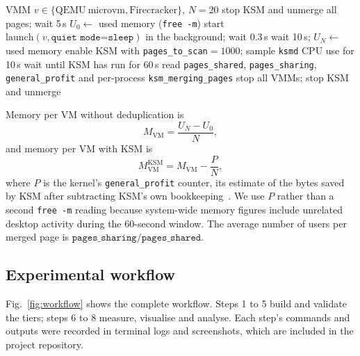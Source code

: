 \documentclass[pdflatex,sn-mathphys-num]{sn-jnl}%
\begin{document}
\begin{algorithm}[ht]
\caption{Density and KSM measurement (B4)}\label{alg:ksm}
\begin{algorithmic}[1]
\Require VMM $v \in \{\mathrm{QEMU\ microvm},\mathrm{Firecracker}\}$, $N=20$
\State stop KSM and unmerge all pages; wait 5\,s
\State $U_0 \gets$ used memory (\texttt{free -m})
  \State start $\mathrm{launch}(v,\texttt{quiet mode=sleep})$ in the background; wait 0.3\,s
\EndFor
\State wait 10\,s; $U_N \gets$ used memory
\State enable KSM with \texttt{pages\_to\_scan}$=1000$; sample \texttt{ksmd} CPU use for 10\,s
\State wait until KSM has run for 60\,s
\State read \texttt{pages\_shared}, \texttt{pages\_sharing}, \texttt{general\_profit} and per-process \texttt{ksm\_merging\_pages}
\State stop all VMMs; stop KSM and unmerge
\end{algorithmic}
\end{algorithm}

Memory per VM without deduplication is
\begin{equation}
M_{\mathrm{VM}} = \frac{U_N - U_0}{N},
\label{eq:mvm}
\end{equation}
and memory per VM with KSM is
\begin{equation}
M_{\mathrm{VM}}^{\mathrm{KSM}} = M_{\mathrm{VM}} - \frac{P}{N},
\label{eq:mksm}
\end{equation}
where $P$ is the kernel's \texttt{general\_profit} counter, its estimate of the bytes saved by KSM after subtracting KSM's own bookkeeping~\cite{kernelksm}. We use $P$ rather than a second \texttt{free -m} reading because system-wide memory figures include unrelated desktop activity during the 60-second window. The average number of users per merged page is $\texttt{pages\_sharing}/\texttt{pages\_shared}$.

\subsection{Experimental workflow}

Fig.~\ref{fig:workflow} shows the complete workflow. Steps 1 to 5 build and validate the tiers; steps 6 to 8 measure, visualise and analyse. Each step's commands and outputs were recorded in terminal logs and screenshots, which are included in the project repository.
\end{document}
